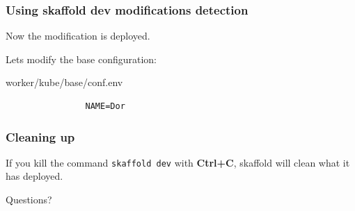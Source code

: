 	\begin{frame}[fragile]
		\frametitle{Using skaffold dev modifications detection}
		
		Now the modification is deployed.
		
		Lets modify the base configuration:
		\begin{block}{worker/kube/base/conf.env}
			\begin{verbatim}
				NAME=Dor
			\end{verbatim}
		\end{block}
		
	\end{frame}
	
	\begin{frame}[fragile]
		\frametitle{Cleaning up}
		
		If you kill the command \verb!skaffold dev! with \textbf{Ctrl+C}, skaffold will clean what it has deployed.
	\end{frame}
	
	\begin{frame}
		\begin{center}
			Questions?
		\end{center}
	\end{frame}